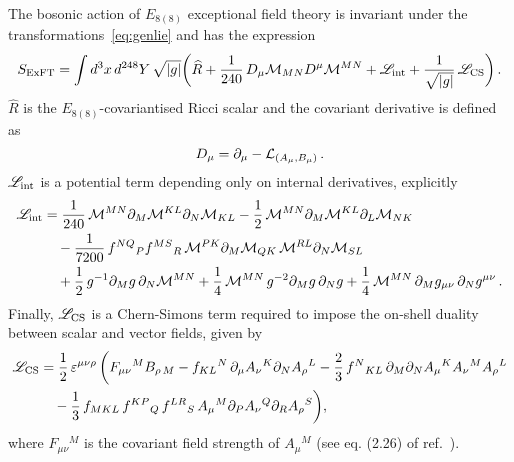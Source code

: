 \documentclass[a4paper, 11pt]{article}
\numberwithin{equation}{section}
\newcommand{\EE}{\ensuremath{E_{8(8)}}\xspace}
\newcommand{\+}{\oplus}
\newcommand{\M}{\ensuremath{\mathcal{M}}\xspace}
\begin{document}
\paragraph{}
The bosonic action of \EE exceptional field theory is invariant under the transformations~\eqref{eq:genlie} and has the expression
\begin{equation} \label{eq:ExFTaction}
	S_{\rm ExFT} = \int d^{3}x\,d^{248}Y\,\sqrt{\vert g\vert} \bigg(\widehat{R}+\frac{1}{240}\,D_{\mu}\M_{MN}D^{\mu}\M^{MN}+\mathscr{L}_{\rm int}+\frac{1}{\sqrt{\vert g\vert}}\,\mathscr{L}_{\rm CS}\bigg)\,.
\end{equation}
$\widehat{R}$ is the \EE-covariantised Ricci scalar and the covariant derivative is defined as
\begin{equation}
	D_{\mu} = \partial_{\mu} - {\cal L}_{(A_{\mu}, B_{\mu})}\,.
\end{equation}
$\mathscr{L}_{\rm int}$ is a potential term depending only on internal derivatives, explicitly
\begin{equation} \label{eq:ExFTLint}
	\begin{aligned}
		\mathscr{L}_{\rm int} &= \frac{1}{240}\,\M^{MN}\partial_{M}\M^{KL}\partial_{N}\M_{KL} - \frac{1}{2}\,\M^{MN}\partial_{M}\M^{KL}\partial_{L}\M_{NK} \\
		&\quad -\frac{1}{7200}\,f^{NQ}{}_{P}f^{MS}{}_{R}\,\M^{PK}\partial_{M}\M_{QK}\,\M^{RL}\partial_{N}\M_{SL}\\
		&\quad +\frac{1}{2}\,g^{-1}\partial_{M}g\,\partial_{N}\M^{MN} + \frac{1}{4}\,\M^{MN}\,g^{-2}\partial_{M}g\,\partial_{N}g + \frac{1}{4}\,\M^{MN}\,\partial_{M}g_{\mu\nu}\,\partial_{N}g^{\mu\nu}\,.
	\end{aligned}
\end{equation}
Finally, $\mathscr{L}_{\rm CS}$ is a Chern-Simons term required to impose the on-shell duality between scalar and vector fields, given by
\begin{equation}
	\begin{aligned}
		\mathscr{L}_{\rm CS} &= \frac{1}{2}\,\varepsilon^{\mu\nu\rho}\,\bigg(F_{\mu\nu}{}^{M}B_{\rho\,M}-f_{KL}{}^{N}\,\partial_{\mu}A_{\nu}{}^{K}\partial_{N}A_{\rho}{}^{L}-\frac{2}{3}\,f^{N}{}_{KL}\,\partial_{M}\partial_{N}A_{\mu}{}^{K}A_{\nu}{}^{M}A_{\rho}{}^{L}\\
		&\quad -\frac{1}{3}\,f_{MKL}\,f^{KP}{}_{Q}\,f^{LR}{}_{S}\,A_{\mu}{}^{M}\partial_{P}A_{\nu}{}^{Q}\partial_{R}A_{\rho}{}^{S}\bigg),
	\end{aligned}
\end{equation}
where $F_{\mu\nu}{}^{M}$ is the covariant field strength of $A_{\mu}{}^{M}$ (see eq. (2.26) of ref.~\cite{Hohm:2014fxa}).
\end{document}
